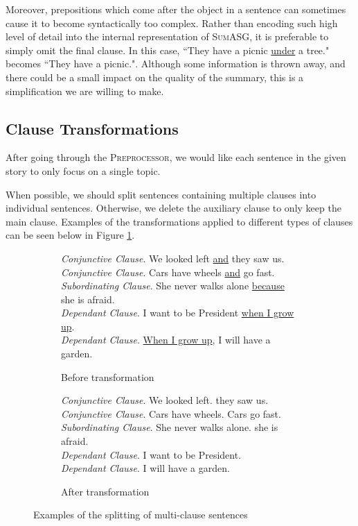 Moreover, prepositions which come after the object in a sentence can sometimes cause it to become syntactically too complex. Rather than encoding such high level of detail into the internal representation of \textsc{SumASG}, it is preferable to simply omit the final clause. In this case, ``They have a picnic \underline{under} a tree." becomes ``They have a picnic.". Although some information is thrown away, and there could be a small impact on the quality of the summary, this is a simplification we are willing to make.

\subsection{Clause Transformations}

After going through the \textsc{Preprocessor}, we would like each sentence in the given story to only focus on a single topic.

When possible, we should split sentences containing multiple clauses into individual sentences. Otherwise, we delete the auxiliary clause to only keep the main clause. Examples of the transformations applied to different types of clauses can be seen below in Figure \ref{fig:clause_transformations}.

\begin{figure}[H]
\begin{subfigure}{\textwidth}
\begin{displayquote}
\textit{Conjunctive Clause}. We looked left \underline{and} they saw us.\\
\textit{Conjunctive Clause}. Cars have wheels \underline{and} go fast.\\
\textit{Subordinating Clause}. She never walks alone \underline{because} she is afraid.\\
\textit{Dependant Clause}. I want to be President \underline{when I grow up}.\\
\textit{Dependant Clause}. \underline{When I grow up}, I will have a garden.
\end{displayquote}
\caption{Before transformation}
\vspace{\baselineskip}
\end{subfigure}
\begin{subfigure}{\textwidth}
\begin{displayquote}
\textit{Conjunctive Clause}. We looked left. they saw us.\\
\textit{Conjunctive Clause}. Cars have wheels. Cars go fast.\\
\textit{Subordinating Clause}. She never walks alone. she is afraid.\\
\textit{Dependant Clause}. I want to be President.\\
\textit{Dependant Clause}. I will have a garden.
\end{displayquote}
\caption{After transformation}
\end{subfigure}
\caption{Examples of the splitting of multi-clause sentences}
\label{fig:clause_transformations}
\end{figure}

